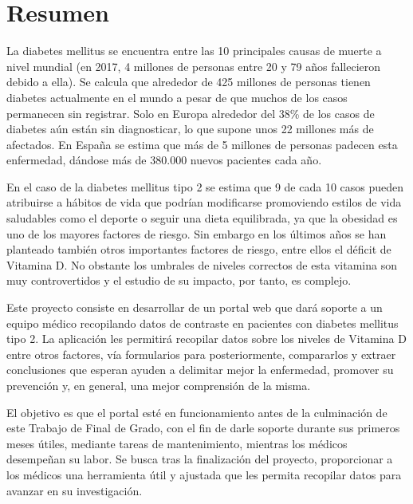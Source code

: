 \chapter*{Resumen}

   La diabetes mellitus se encuentra entre las 10 principales causas de muerte a nivel mundial (en 2017, 4 millones de personas entre 20 y 79 años fallecieron debido a ella). Se calcula que alrededor de 425 millones de personas tienen diabetes actualmente en el mundo a pesar de que muchos de los casos permanecen sin registrar. Solo en Europa alrededor del 38\% de los casos de diabetes aún están sin diagnosticar, lo que supone unos 22 millones más de afectados. En España se estima que más de 5 millones de personas padecen esta enfermedad, dándose más de 380.000 nuevos pacientes cada año.  \newline
   
	En el caso de la diabetes mellitus tipo 2 se estima que 9 de cada 10 casos pueden atribuirse a hábitos de vida que podrían modificarse promoviendo estilos de vida saludables como el deporte o seguir una dieta equilibrada, ya que la obesidad es uno de los mayores factores de riesgo. Sin embargo en los últimos años se han planteado también otros importantes factores de riesgo, entre ellos el déficit de Vitamina D. No obstante los umbrales de niveles correctos de esta vitamina son muy controvertidos y el estudio de su impacto, por tanto, es complejo. \newline

    Este proyecto consiste en desarrollar de un portal web que dará soporte a un equipo médico recopilando datos de contraste en pacientes con diabetes mellitus tipo 2. La aplicación les permitirá recopilar datos sobre los niveles de Vitamina D entre otros factores, vía formularios para posteriormente, compararlos y extraer conclusiones que esperan ayuden a delimitar mejor la enfermedad, promover su prevención y, en general, una mejor comprensión de la misma. \newline

    El objetivo es que el portal esté en funcionamiento antes de la culminación de este Trabajo de Final de Grado, con el fin de darle soporte durante sus primeros meses útiles, mediante tareas de mantenimiento, mientras los médicos desempeñan su labor. Se busca tras la finalización del proyecto, proporcionar a los médicos una herramienta útil y ajustada que les permita recopilar datos para avanzar en su investigación.
